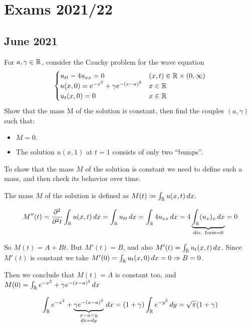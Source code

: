 \section{Exams 2021/22}
\subsection{June 2021}
\begin{exercise}
    For \(a, \gamma \in \mathbb{R}\), consider the Cauchy problem for the wave equation
    \begin{equation*}
        \begin{cases}
            u_{tt} - 4u_{xx} = 0                     & (x,t) \in \mathbb{R} \times (0, \infty) \\
            u(x, 0) = e^{-x^2} + \gamma e^{-(x-a)^2} & x \in \mathbb{R}                        \\
            u_t(x, 0) = 0                            & x \in \mathbb{R}
        \end{cases}
    \end{equation*}
    Show that the mass M of the solution is constant, then find the couples \((a, \gamma)\) such that:
    \begin{itemize}
        \item \(M = 0.\)
        \item The solution \(u(x,1)\) at \(t=1\) consists of only two ``bumps''.
    \end{itemize}
\end{exercise}

To show that the mass \(M\) of the solution is constant we need to define such
a mass, and then check its behavior over time.

The mass \(M\) of the solution is defined as \(M(t) \coloneqq \int_{\mathbb{R}} u(x,t)
\, dx\).

\[M''(t) = \frac{\partial^2}{\partial^2 t} \int_{\mathbb{R}} u(x,t) \, dx = \int_{\mathbb{R}} u_{tt} \, dx = \int_{\mathbb{R}} 4 u_{xx}\, dx = 4 \underbrace{\int_{\mathbb{R}} (u_x)_x\, dx}_{\text{div. form} = 0} = 0\]

So \(M(t) = A + Bt\). But \(M'(t) = B\), and also \(M'(t) = \int_{\mathbb{R}}
u_t(x,t)\, dx\). Since \(M'(t)\) is constant we take \(M'(0) = \int_{\mathbb{R}}
u_t(x,0)\, dx = 0 \Rightarrow B = 0\).

Then we conclude that \(M(t) = A\) is constant too, and \(M(0) = \int_{\mathbb{R}}
e^{-x^2} + \gamma e^{-(x-a)^2} \, dx\)

\[
    \int_{\mathbb{R}} e^{-x^2} + \underbrace{\gamma e^{-(x-a)^2}}_{\substack{x-a=y \\ dx = dy}} \, dx = (1+ \gamma) \int_{\mathbb{R}} e^{-y^2} \, dy = \sqrt{\pi} (1 + \gamma)
\]

